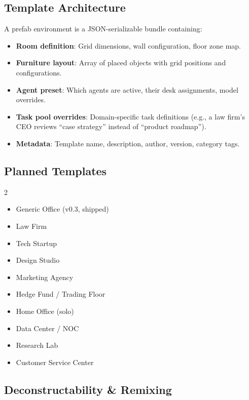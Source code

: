 \documentclass[11pt,letterpaper]{article}
\begin{document}
\subsection{Template Architecture}

A prefab environment is a JSON-serializable bundle containing:

\begin{itemize}[leftmargin=2em]
  \item \textbf{Room definition}: Grid dimensions, wall configuration, floor zone map.
  \item \textbf{Furniture layout}: Array of placed objects with grid positions and configurations.
  \item \textbf{Agent preset}: Which agents are active, their desk assignments, model overrides.
  \item \textbf{Task pool overrides}: Domain-specific task definitions (e.g., a law firm's CEO reviews ``case strategy'' instead of ``product roadmap'').
  \item \textbf{Metadata}: Template name, description, author, version, category tags.
\end{itemize}

\subsection{Planned Templates}

\begin{multicols}{2}
\begin{itemize}[leftmargin=1.5em,itemsep=1pt]
  \item Generic Office (v0.3, shipped)
  \item Law Firm
  \item Tech Startup
  \item Design Studio
  \item Marketing Agency
  \item Hedge Fund / Trading Floor
  \item Home Office (solo)
  \item Data Center / NOC
  \item Research Lab
  \item Customer Service Center
\end{itemize}
\end{multicols}

\subsection{Deconstructability \& Remixing}
\end{document}
